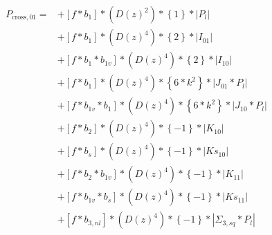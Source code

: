 \documentclass{article}
\begin{document}
\begin{equation}
\begin{aligned} 
P_{\mathrm{cross},01}=
&+\left[f*b_{1}\right]*\left(D(z)^{2}\right)*\left\{1\right\}*\left|P_l\right| \\
&+\left[f*b_{1}\right]*\left(D(z)^{4}\right)*\left\{2\right\}*\left|I_{01}\right| \\
&+\left[f*b_{1}*b_{1v}\right]*\left(D(z)^{4}\right)*\left\{2\right\}*\left|I_{10}\right| \\
&+\left[f*b_{1}\right]*\left(D(z)^{4}\right)*\left\{6*k^{2}\right\}*\left|J_{01}*P_l\right| \\
&+\left[f*b_{1v}*b_{1}\right]*\left(D(z)^{4}\right)*\left\{6*k^{2}\right\}*\left|J_{10}*P_l\right| \\
&+\left[f*b_{2}\right]*\left(D(z)^{4}\right)*\left\{-1\right\}*\left|K_{10}\right| \\
&+\left[f*b_{s}\right]*\left(D(z)^{4}\right)*\left\{-1\right\}*\left|Ks_{10}\right| \\
&+\left[f*b_{2}*b_{1v}\right]*\left(D(z)^{4}\right)*\left\{-1\right\}*\left|K_{11}\right| \\
&+\left[f*b_{1v}*b_{s}\right]*\left(D(z)^{4}\right)*\left\{-1\right\}*\left|Ks_{11}\right| \\
&+\left[f*b_{3,nl}\right]*\left(D(z)^{4}\right)*\left\{-1\right\}*\left|\Sigma_{3,sq}*P_l\right| \\
\end{aligned}
\end{equation}
\end{document}
